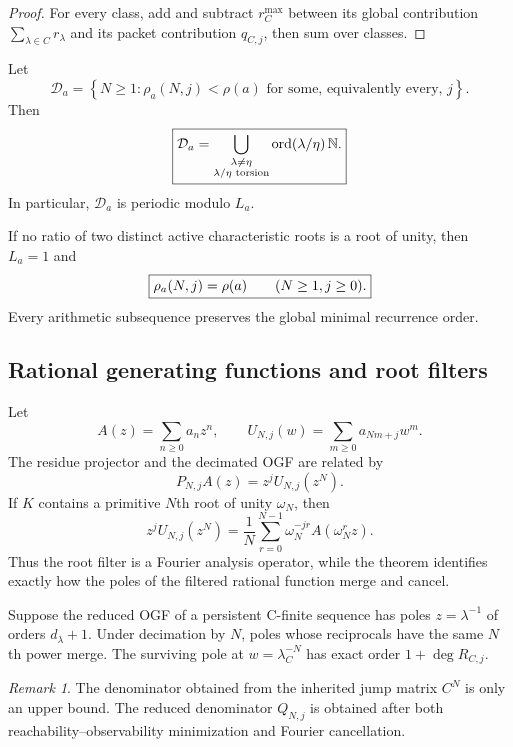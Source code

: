 \documentclass[11pt]{article}
\theoremstyle{definition}\newtheorem{definition}[theorem]{Definition}\newtheorem{example}[theorem]{Example}\newtheorem{construction}[theorem]{Construction}\newtheorem{algorithm}[theorem]{Algorithm}\newtheorem{conjecture}[theorem]{Conjecture}\newtheorem{problem}[theorem]{Problem}
\theoremstyle{remark}\newtheorem{remark}[theorem]{Remark}\newtheorem{boundary}[theorem]{Boundary}\newtheorem{certificate}[theorem]{Computational Certificate}\newtheorem{classical}[theorem]{Classical Input}\newtheorem{principle}[theorem]{Structural Principle}
\begin{document}
\begin{proof}
For every class, add and subtract $r_C^{\max}$ between its global contribution $\sum_{\lambda\in C}r_\lambda$ and its packet contribution $q_{C,j}$, then sum over classes.
\end{proof}

\begin{corollary}
Let
\[
 \mathcal D_a=
 \left\{N\geq1:\rho_a(N,j)<\rho(a)\text{ for some, equivalently every, }j\right\}.
\]
Then
\[
 \boxed{
 \mathcal D_a
 =
 \bigcup_{\substack{\lambda\neq\eta\\\lambda/\eta\text{ torsion}}}
 \operatorname{ord}(\lambda/\eta)\,\mathbb N.
 }
\]
In particular, $\mathcal D_a$ is periodic modulo $L_a$.
\end{corollary}

\begin{corollary}
If no ratio of two distinct active characteristic roots is a root of unity, then $L_a=1$ and
\[
 \boxed{
 \rho_a(N,j)=\rho(a)
 \qquad(N\geq1,\\ j\geq0).
 }
\]
Every arithmetic subsequence preserves the global minimal recurrence order.
\end{corollary}

\subsection{Rational generating functions and root filters}
Let
\[
 A(z)=\sum_{n\geq0}a_nz^n,
 \qquad
 U_{N,j}(w)=\sum_{m\geq0}a_{Nm+j}w^m.
\]
The residue projector and the decimated OGF are related by
\[
 \boxed{
 P_{N,j}A(z)=z^jU_{N,j}(z^N).
 }
\]
If $K$ contains a primitive $N$th root of unity $\omega_N$, then
\[
 \boxed{
 z^jU_{N,j}(z^N)
 =
 \frac1N\sum_{r=0}^{N-1}\omega_N^{-jr}A(\omega_N^rz).
 }
\]
Thus the root filter is a Fourier analysis operator, while the theorem identifies exactly how the poles of the filtered rational function merge and cancel.

\begin{corollary}
Suppose the reduced OGF of a persistent C-finite sequence has poles $z=\lambda^{-1}$ of orders $d_\lambda+1$.  Under decimation by $N$, poles whose reciprocals have the same $N$th power merge.  The surviving pole at $w=\lambda_C^{-N}$ has exact order $1+\deg R_{C,j}$.
\end{corollary}

\begin{remark}
The denominator obtained from the inherited jump matrix $C^N$ is only an upper bound.  The reduced denominator $Q_{N,j}$ is obtained after both reachability--observability minimization and Fourier cancellation.
\end{remark}
\end{document}
